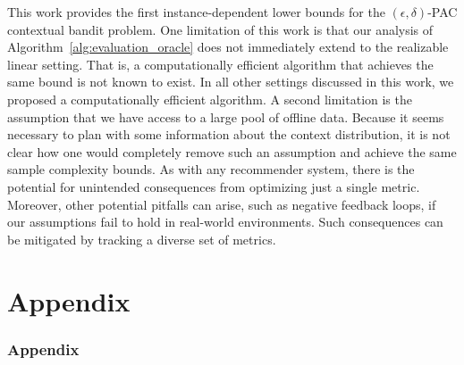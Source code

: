 \documentclass{article}
\newcommand{\1}{\mathbf{1}}
\begin{document}
This work provides the first instance-dependent lower bounds for the $(\epsilon,\delta)$-PAC contextual bandit problem. 
One limitation of this work is that our analysis of Algorithm~\ref{alg:evaluation_oracle} does not immediately extend to the realizable linear setting. That is, a computationally efficient algorithm that achieves the same bound is not known to exist. 
In all other settings discussed in this work, we proposed a computationally efficient algorithm.
A second limitation is the assumption that we have access to a large pool of offline data. 
Because it seems necessary to plan with some information about the context distribution, it is not clear how one would completely remove such an assumption and achieve the same sample complexity bounds. As with any recommender system, there is the potential for unintended consequences from optimizing just a single metric. Moreover, other potential pitfalls can arise, such as negative feedback loops, if our assumptions fail to hold in real-world environments. Such consequences can be mitigated by tracking a diverse set of metrics.




\clearpage



\clearpage
\appendix

\part{Appendix} %
\parttoc %

\section*{Appendix}
\end{document}
